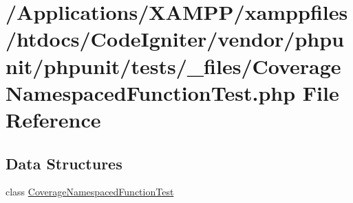 \hypertarget{_coverage_namespaced_function_test_8php}{}\section{/\+Applications/\+X\+A\+M\+P\+P/xamppfiles/htdocs/\+Code\+Igniter/vendor/phpunit/phpunit/tests/\+\_\+files/\+Coverage\+Namespaced\+Function\+Test.php File Reference}
\label{_coverage_namespaced_function_test_8php}
\subsection*{Data Structures}
\begin{DoxyCompactItemize}
\item 
class \mbox{\hyperlink{class_coverage_namespaced_function_test}{Coverage\+Namespaced\+Function\+Test}}
\end{DoxyCompactItemize}
